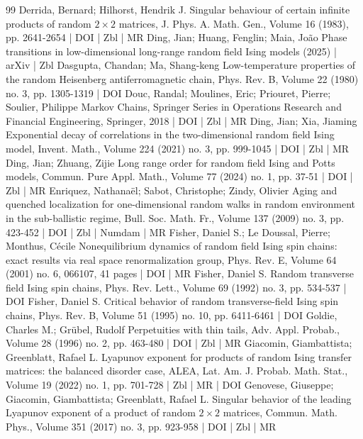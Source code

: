 \begin{thebibliography}{99}
 Derrida, Bernard; Hilhorst, Hendrik J. Singular behaviour of certain infinite products of random $2\times 2$ matrices, J. Phys. A. Math. Gen., Volume 16 (1983), pp. 2641-2654 | DOI | Zbl | MR
 Ding, Jian; Huang, Fenglin; Maia, João Phase transitions in low-dimensional long-range random field Ising models (2025) | arXiv | Zbl
 Dasgupta, Chandan; Ma, Shang-keng Low-temperature properties of the random Heisenberg antiferromagnetic chain, Phys. Rev. B, Volume 22 (1980) no. 3, pp. 1305-1319 | DOI
 Douc, Randal; Moulines, Eric; Priouret, Pierre; Soulier, Philippe Markov Chains, Springer Series in Operations Research and Financial Engineering, Springer, 2018 | DOI | Zbl | MR
 Ding, Jian; Xia, Jiaming Exponential decay of correlations in the two-dimensional random field Ising model, Invent. Math., Volume 224 (2021) no. 3, pp. 999-1045 | DOI | Zbl | MR
 Ding, Jian; Zhuang, Zijie Long range order for random field Ising and Potts models, Commun. Pure Appl. Math., Volume 77 (2024) no. 1, pp. 37-51 | DOI | Zbl | MR
 Enriquez, Nathanaël; Sabot, Christophe; Zindy, Olivier Aging and quenched localization for one-dimensional random walks in random environment in the sub-ballistic regime, Bull. Soc. Math. Fr., Volume 137 (2009) no. 3, pp. 423-452 | DOI | Zbl | Numdam | MR
 Fisher, Daniel S.; Le Doussal, Pierre; Monthus, Cécile Nonequilibrium dynamics of random field Ising spin chains: exact results via real space renormalization group, Phys. Rev. E, Volume 64 (2001) no. 6, 066107, 41 pages | DOI | MR
 Fisher, Daniel S. Random transverse field Ising spin chains, Phys. Rev. Lett., Volume 69 (1992) no. 3, pp. 534-537 | DOI
 Fisher, Daniel S. Critical behavior of random transverse-field Ising spin chains, Phys. Rev. B, Volume 51 (1995) no. 10, pp. 6411-6461 | DOI
 Goldie, Charles M.; Grübel, Rudolf Perpetuities with thin tails, Adv. Appl. Probab., Volume 28 (1996) no. 2, pp. 463-480 | DOI | Zbl | MR
 Giacomin, Giambattista; Greenblatt, Rafael L. Lyapunov exponent for products of random Ising transfer matrices: the balanced disorder case, ALEA, Lat. Am. J. Probab. Math. Stat., Volume 19 (2022) no. 1, pp. 701-728 | Zbl | MR | DOI
 Genovese, Giuseppe; Giacomin, Giambattista; Greenblatt, Rafael L. Singular behavior of the leading Lyapunov exponent of a product of random $2 \times 2$ matrices, Commun. Math. Phys., Volume 351 (2017) no. 3, pp. 923-958 | DOI | Zbl | MR

\end{thebibliography}
